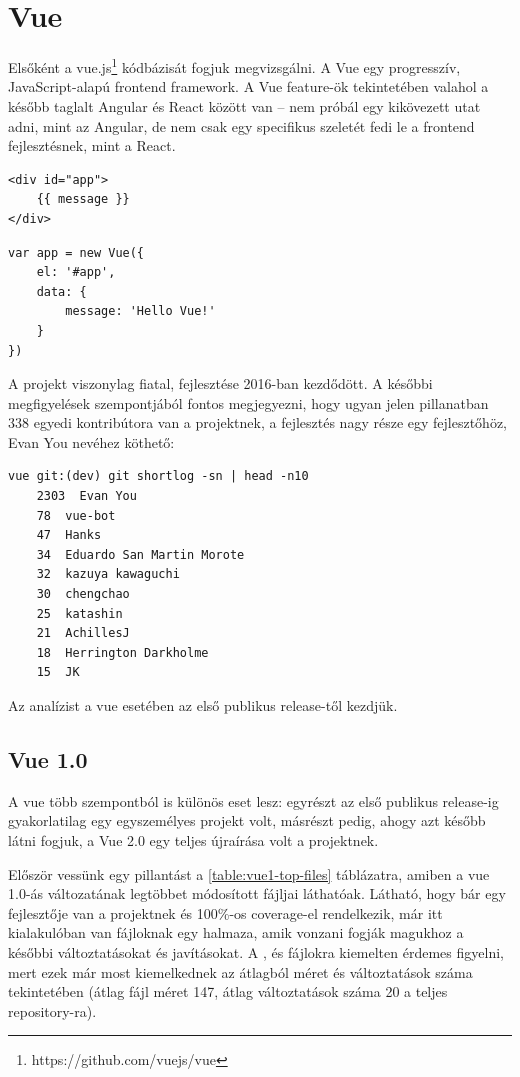 \section{Vue}

Elsőként a vue.js\footnote{https://github.com/vuejs/vue} kódbázisát fogjuk megvizsgálni. A Vue egy progresszív, JavaScript-alapú frontend framework. A Vue feature-ök tekintetében valahol a később taglalt Angular és React között van -- nem próbál egy kikövezett utat adni, mint az Angular, de nem csak egy specifikus szeletét fedi le a frontend fejlesztésnek, mint a React.

\begin{lstlisting}
<div id="app">
    {{ message }}
</div>
\end{lstlisting}

\begin{lstlisting}
var app = new Vue({
    el: '#app',
    data: {
        message: 'Hello Vue!'
    }
})
\end{lstlisting}

A projekt viszonylag fiatal, fejlesztése 2016-ban kezdődött. A későbbi megfigyelések szempontjából fontos megjegyezni, hogy ugyan jelen pillanatban 338 egyedi kontribútora van a projektnek, a fejlesztés nagy része egy fejlesztőhöz, Evan You nevéhez köthető:

\begin{lstlisting}
vue git:(dev) git shortlog -sn | head -n10
    2303  Evan You
    78  vue-bot
    47  Hanks
    34  Eduardo San Martin Morote
    32  kazuya kawaguchi
    30  chengchao
    25  katashin
    21  AchillesJ
    18  Herrington Darkholme
    15  JK
\end{lstlisting}\label{code:vue-authors}

Az analízist a vue esetében az első publikus release-től kezdjük.

\subsection{Vue 1.0}

A vue több szempontból is különös eset lesz: egyrészt az első publikus release-ig gyakorlatilag egy egyszemélyes projekt volt, másrészt pedig, ahogy azt később látni fogjuk, a Vue 2.0 egy teljes újraírása volt a projektnek.

Először vessünk egy pillantást a \ref{table:vue1-top-files} táblázatra, amiben a vue 1.0-ás változatának legtöbbet módosított fájljai láthatóak. Látható, hogy bár egy fejlesztője van a projektnek és 100\%-os coverage-el rendelkezik, már itt kialakulóban van fájloknak egy halmaza, amik vonzani fogják magukhoz a későbbi változtatásokat és javításokat. A ,  és  fájlokra kiemelten érdemes figyelni, mert ezek már most kiemelkednek az átlagból méret és változtatások száma tekintetében (átlag fájl méret 147, átlag változtatások száma 20 a teljes repository-ra).

